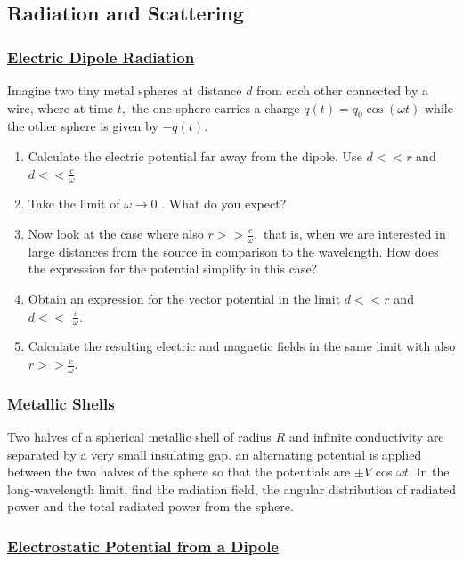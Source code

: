 \subsection{Radiation and Scattering}

\subsubsection{\hyperref[Electric Dipole Radiation]{Electric Dipole Radiation}}

Imagine two tiny metal spheres at distance $d$ from each other connected by a wire, where at time $t,$ the one sphere carries a charge $q(t)=q_{0} \cos (\omega t)$ while the other sphere is given by $-q(t)$.

\begin{enumerate}
	\item  Calculate the electric potential far away from the dipole. Use $d<<r$ and $d<<\frac{c}{\omega}$
	\item Take the limit of $\omega \rightarrow 0$ . What do you expect?
	\item Now look at the case where also $r>>\frac{c}{\omega},$ that is, when we are interested in large distances from the source in comparison to the wavelength. How does the expression for the potential simplify in this case?
	\item Obtain an expression for the vector potential in the limit $d<<r$ and $d<<$ $\frac{c}{\omega}$.
	\item Calculate the resulting electric and magnetic fields in the same limit with also $r>>\frac{c}{\omega}$.
\end{enumerate}

\subsubsection{\hyperref[Metallic Shells]{Metallic Shells}}
Two halves of a spherical metallic shell of radius $R$ and infinite conductivity are separated by a very small insulating gap. an alternating potential is applied between the two halves of the sphere so that the potentials are $\pm V$ cos $\omega t .$ In the long-wavelength limit, find the radiation field, the angular distribution of radiated power and the total radiated power from the sphere.

\subsubsection{\hyperref[Electrostatic Potential from a Dipole]{Electrostatic Potential from a Dipole}}

